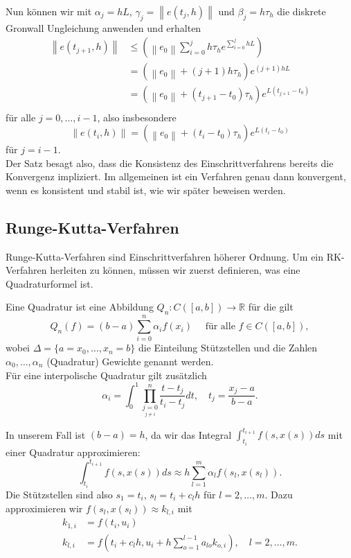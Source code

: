 Nun können wir mit $\alpha_j=hL$, $\gamma_j =\left\lVert e(t_j,h) \right\rVert$ und $\beta_j = h\tau_h$ die diskrete
Gronwall Ungleichung anwenden und erhalten
\begin{align*}
    \left\lVert e(t_{j+1},h) \right\rVert
    &\leq \left( \left\lVert e_0 \right\rVert \sum_{i=0}^{j} h\tau_h e^{\sum_{i=0}^{j} hL } \right)\\
    &= \left( \left\lVert e_0 \right\rVert + (j+1)h \tau_h \right)e^{(j+1)hL} \\
    &= \left( \left\lVert e_0 \right\rVert + (t_{j+1} - t_0) \tau_h \right)e^{L(t_{j+1} - t_0)} \\
\end{align*}
für alle $j=0, \dots, i-1$, also insbesondere
\[
    \left\lVert e(t_{i},h) \right\rVert
    = \left( \left\lVert e_0 \right\rVert + (t_{i} - t_0) \tau_h \right)e^{L(t_{i} - t_0)}
\]
für $j=i-1$.\qedwhite\\
Der Satz besagt also, dass die Konsistenz des Einschrittverfahrens bereits die Konvergenz impliziert. Im allgemeinen ist
ein Verfahren genau dann konvergent, wenn es konsistent und stabil ist, wie wir später beweisen werden.

\subsection{Runge-Kutta-Verfahren}
Runge-Kutta-Verfahren sind Einschrittverfahren höherer Ordnung. Um ein RK-Verfahren herleiten zu können, müssen wir
zuerst definieren, was eine Quadraturformel ist.
\begin{definition}
    Eine Quadratur ist eine Abbildung $Q_n: C([a,b])\rightarrow \mathbb{R}$ für die gilt
    \[
        Q_n(f) = (b-a)\sum_{i=0}^{n}\alpha_i f(x_i) \quad \text{ für alle } f\in C([a,b]),
    \]
    wobei $\Delta = \{a=x_0, \dots, x_n=b\}$ die Einteilung Stützstellen und die Zahlen $\alpha_0, \dots, \alpha_n$
    (Quadratur) Gewichte genannt werden.\\
    Für eine interpolische Quadratur gilt zusätzlich
    \[
        \alpha_i = \int_{0}^{1} \prod_{\underset{j\neq i}{j=0}}^{n} \frac{t-t_j}{t_i-t_j} dt,
        \quad t_j = \frac{x_j-a}{b-a}.
    \]
\end{definition}
In unserem Fall ist $(b-a)=h$, da wir das Integral $\int_{t_i}^{t_{i+1}} f(s,x(s))ds$ mit einer Quadratur approximieren:
\[
    \int_{t_i}^{t_{i+1}} f(s,x(s))ds \approx h \sum_{l=1}^{m}\alpha_l f(s_l,x(s_l)).
\]
Die Stützstellen sind also $s_1=t_i$, $s_l=t_i+c_{l} h$ für $l = 2,\dots, m$. Dazu approximieren wir
$f(s_l,x(s_l))\approx k_{l,i}$ mit
\begin{align}
    k_{1,i} &= f(t_i,u_i) \nonumber \\
    k_{l,i} &= f(t_i+c_lh, u_i + h\sum_{o=1}^{l-1}a_{lo}k_{o,i} ), \quad l=2,\dots,m.   \label{eq:rk}
\end{align}


